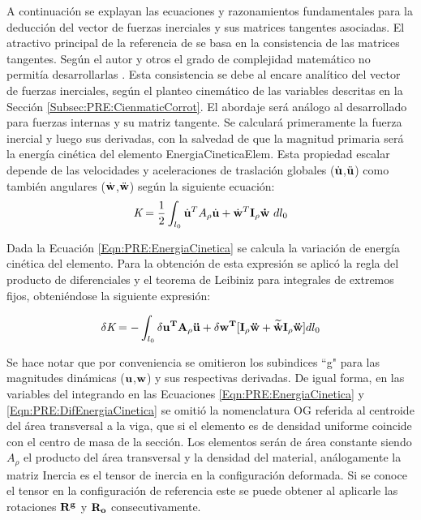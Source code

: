A continuación se explayan las ecuaciones y razonamientos fundamentales para la deducción del vector de fuerzas inerciales y sus matrices tangentes asociadas. El atractivo principal de la referencia de \cite{Le2014} se basa en la consistencia de las matrices tangentes. Según el autor y otros el grado de complejidad matemático no permitía desarrollarlas \citep{Crisfield}. Esta consistencia se debe al encare analítico del vector de fuerzas inerciales, según el planteo cinemático de las variables descritas en la Sección \ref{Subsec:PRE:CienmaticCorrot}. El abordaje será análogo al desarrollado para fuerzas internas y su matriz tangente. Se calculará primeramente la fuerza inercial y luego sus derivadas, con la salvedad de que la magnitud primaria será la energía cinética del elemento \gls{EnergiaCineticaElem}. Esta propiedad escalar depende de las velocidades y aceleraciones de traslación globales ($\dot{\bf{u}}$,$\ddot{\bf{u}}$) como también angulares ($\dot{\bf{w}}$,$\ddot{\bf{w}}$) según la siguiente ecuación:
\begin{equation}
	\label{Eqn:PRE:EnergiaCinetica}
	\textit{K}=\frac{1}{2}\int_{l_0} {\dot{\bf{u}}^T A_{\rho} \dot{\bf{u}} +
	\dot{\bf{w}}^T \bf{I_{\rho}}\dot{\bf{w}}} ~\text{$dl_0$}
\end{equation}

 Dada la Ecuación \eqref{Eqn:PRE:EnergiaCinetica} se calcula la variación de energía cinética del elemento. Para la obtención de esta expresión se aplicó la regla del producto de diferenciales y el teorema de Leibiniz para integrales de extremos fijos, obteniéndose la siguiente expresión:

\begin{equation}
	\label{Eqn:PRE:DifEnergiaCinetica}
	\delta\textit{K}=-\int_{l_0} \delta \bf{u}^T A_{\rho} \ddot{\bf{u}} +\delta
	\bf{w}^T[\bf{I_{\rho}}\ddot{\bf{w}}+\widetilde{\dot{\bf{w}}}\bf{I_{\rho}}\ddot{\bf{w}}]
	\text{$dl_0$}
\end{equation}


Se hace notar que por conveniencia se omitieron los subindices ``g" para las magnitudes dinámicas ($\bf{u}$,$\bf{w}$) y sus respectivas derivadas. De igual forma, en las variables del integrando en las Ecuaciones  \eqref{Eqn:PRE:EnergiaCinetica} y \eqref{Eqn:PRE:DifEnergiaCinetica} se omitió la nomenclatura OG referida al centroide del área transversal a la viga, que si el elemento es de densidad uniforme coincide con el centro de masa de la sección. Los elementos serán de área constante siendo  $A_{\rho}$  el producto del área transversal y la densidad del material, análogamente la matriz \gls{Inercia} es el tensor de inercia en la configuración deformada. Si se conoce el tensor en la configuración de referencia este se puede obtener al aplicarle las rotaciones $\bf{R}^g$ y $\bf{R}_o$ consecutivamente.

